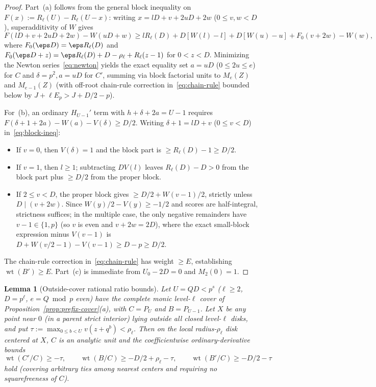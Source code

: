 \documentclass[11pt,reqno]{amsart}
\numberwithin{equation}{section}
\newtheorem{lemma}[theorem]{Lemma}
\theoremstyle{definition}
\theoremstyle{remark}
\newcommand{\wt}{\operatorname{wt}}
\begin{document}
\begin{proof}
Part~(a) follows from the general block inequality on $F(x):=R_\ell(U)-R_\ell(U-x)$: writing $x=lD+v+2uD+2w$ ($0\le v,w<D$), superadditivity of $W$ gives
\begin{equation}
\label{eq:block-ineq}
F(lD+v+2uD+2w) - W(uD+w) \ge lR_\ell(D) + D[W(l)-l] + D[W(u)-u] + F_0(v+2w) - W(w),
\end{equation}
where $F_0(\eps D)=\eps R_\ell(D)$ and $F_0(\eps D+z)=\eps R_\ell(D)+D-\rho_\ell+R_\ell(z-1)$ for $0<z<D$. Minimizing the Newton series~\eqref{eq:newton} yields the exact equality set $a=uD$ ($0\le 2u\le e$) for $C$ and $\delta=p^2, a=uD$ for $C'$, summing via block factorial units to $M_e(Z)$ and $M_{e-1}(Z)$ (with off-root chain-rule correction in~\eqref{eq:chain-rule} bounded below by $J+\ell E_p > J+D/2-p$).

For~(b), an ordinary $H_{U-1}'$ term with $h+\delta+2a=U-1$ requires $F(\delta+1+2a)-W(a)-V(\delta)\ge D/2$. Writing $\delta+1=lD+v$ ($0\le v<D$) in~\eqref{eq:block-ineq}:
\begin{itemize}[leftmargin=1.5em]
\item If $v=0$, then $V(\delta)=1$ and the block part is $\ge R_\ell(D)-1\ge D/2$.
\item If $v=1$, then $l\ge 1$; subtracting $D V(l)$ leaves $R_\ell(D)-D > 0$ from the block part plus $\ge D/2$ from the proper block.
\item If $2\le v<D$, the proper block gives $\ge D/2 + W(v-1)/2$, strictly unless $D\mid (v+2w)$. Since $W(y)/2 - V(y)\ge -1/2$ and scores are half-integral, strictness suffices; in the multiple case, the only negative remainders have $v-1\in\{1,p\}$ (so $v$ is even and $v+2w=2D$), where the exact small-block expression minus $V(v-1)$ is $D+W(v/2-1)-V(v-1)\ge D-p\ge D/2$.
\end{itemize}
The chain-rule correction in~\eqref{eq:chain-rule} has weight $\ge E$, establishing $\wt(B')\ge E$. Part~(c) is immediate from $U_0-2D=0$ and $M_2(0)=1$.
\end{proof}

\begin{lemma}[Outside-cover rational ratio bounds]
\label{lem:outside-ratio}
Let $U = QD < p^s$ ($\ell\ge 2$, $D=p^\ell$, $e=Q\bmod p$ even) have the complete monic level-$\ell$ cover of Proposition~\ref{prop:prefix-cover}(a), with $C=P_U$ and $B=P_{U-1}$. Let $X$ be any point near $0$ (in a parent strict interior) lying \emph{outside} all closed level-$\ell$ disks, and put $\tau := \max_{0\le b<U} v(z+q^b) < \rho_\ell$. Then on the local radius-$\rho_\ell$ disk centered at $X$, $C$ is an analytic unit and the coefficientwise ordinary-derivative bounds
\begin{equation}
\label{eq:outside-ratios}
\wt(C'/C) \ge -\tau,\qquad
\wt(B/C) \ge -D/2 + \rho_\ell - \tau,\qquad
\wt(B'/C) \ge -D/2 - \tau
\end{equation}
hold (covering arbitrary ties among nearest centers and requiring no squarefreeness of $C$).
\end{lemma}
\end{document}
